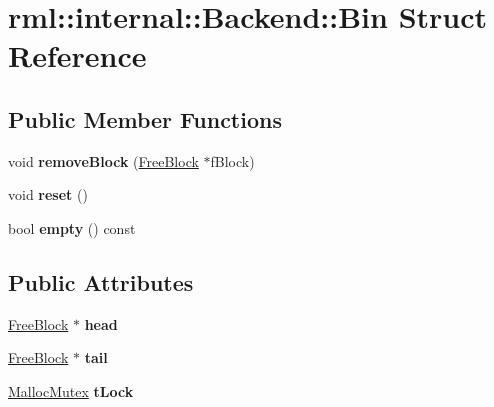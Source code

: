 \hypertarget{structrml_1_1internal_1_1Backend_1_1Bin}{}\section{rml\+:\+:internal\+:\+:Backend\+:\+:Bin Struct Reference}
\label{structrml_1_1internal_1_1Backend_1_1Bin}
\subsection*{Public Member Functions}
\begin{DoxyCompactItemize}
\item 
\hypertarget{structrml_1_1internal_1_1Backend_1_1Bin_a109fe454ebc2c16b036d5150e6fa1a03}{}void {\bfseries remove\+Block} (\hyperlink{classrml_1_1internal_1_1FreeBlock}{Free\+Block} $\ast$f\+Block)\label{structrml_1_1internal_1_1Backend_1_1Bin_a109fe454ebc2c16b036d5150e6fa1a03}

\item 
\hypertarget{structrml_1_1internal_1_1Backend_1_1Bin_a99914446abb9d7b95f8b0695b36fc91e}{}void {\bfseries reset} ()\label{structrml_1_1internal_1_1Backend_1_1Bin_a99914446abb9d7b95f8b0695b36fc91e}

\item 
\hypertarget{structrml_1_1internal_1_1Backend_1_1Bin_a1881b16c3cecd6a9cf1cd910d61e53a0}{}bool {\bfseries empty} () const \label{structrml_1_1internal_1_1Backend_1_1Bin_a1881b16c3cecd6a9cf1cd910d61e53a0}

\end{DoxyCompactItemize}
\subsection*{Public Attributes}
\begin{DoxyCompactItemize}
\item 
\hypertarget{structrml_1_1internal_1_1Backend_1_1Bin_a387fdca591344a6845edfecc901916b1}{}\hyperlink{classrml_1_1internal_1_1FreeBlock}{Free\+Block} $\ast$ {\bfseries head}\label{structrml_1_1internal_1_1Backend_1_1Bin_a387fdca591344a6845edfecc901916b1}

\item 
\hypertarget{structrml_1_1internal_1_1Backend_1_1Bin_aafe5752d2149659015c29cc503ff475e}{}\hyperlink{classrml_1_1internal_1_1FreeBlock}{Free\+Block} $\ast$ {\bfseries tail}\label{structrml_1_1internal_1_1Backend_1_1Bin_aafe5752d2149659015c29cc503ff475e}

\item 
\hypertarget{structrml_1_1internal_1_1Backend_1_1Bin_aad743aa0232e706fea9eea215d9990c3}{}\hyperlink{classMallocMutex}{Malloc\+Mutex} {\bfseries t\+Lock}\label{structrml_1_1internal_1_1Backend_1_1Bin_aad743aa0232e706fea9eea215d9990c3}

\end{DoxyCompactItemize}


